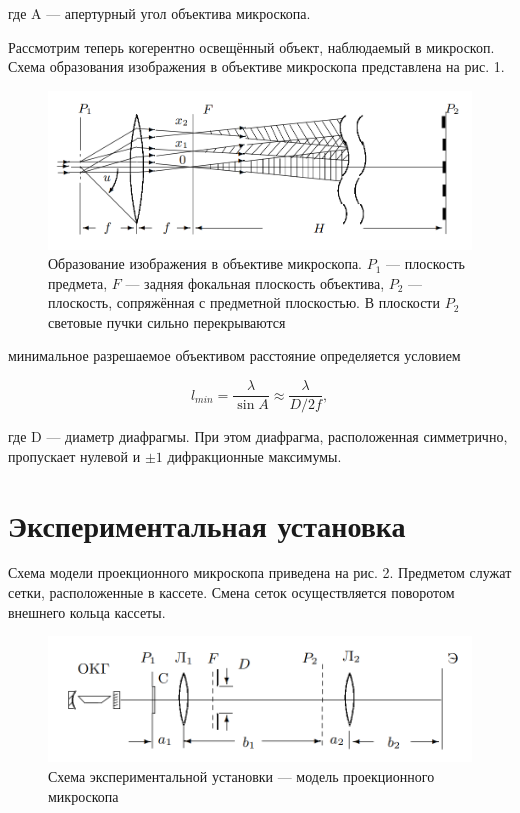 \documentclass[12pt]{article}
\begin{document}
где A — апертурный угол объектива микроскопа. \par
Рассмотрим теперь когерентно освещённый объект, наблюдаемый в микроскоп. Схема образования изображения в объективе микроскопа
представлена на рис. 1.
    \begin{figure}[h]
    \centering
    \includegraphics[width=15cm]{fig2.PNG}
    \caption{Образование изображения в объективе микроскопа. $P_1$ — плоскость предмета, $F$ — задняя фокальная плоскость объектива, $P_2$ — плоскость,
сопряжённая с предметной плоскостью. В плоскости $P_2$ световые пучки
сильно перекрываются}
    \label{fig:vac}
\end{figure}

минимальное разрешаемое объективом расстояние
определяется условием

\begin{equation}
    l_{min} = \frac{\lambda}{\sin A} \approx \frac{\lambda}{D/2f},
\end{equation}

где D — диаметр диафрагмы. При этом диафрагма, расположенная
симметрично, пропускает нулевой и $\pm1$ дифракционные максимумы.


\section{Экспериментальная установка}

Схема модели проекционного микроскопа приведена на рис. 2. Предметом служат сетки, расположенные
в кассете. Смена сеток осуществляется поворотом внешнего кольца кассеты.

    \begin{figure}[h]
    \centering
    \includegraphics[width=15cm]{fig1.PNG}
    \caption{Схема экспериментальной установки — модель проекционного
микроскопа}
    \label{fig:vac}
\end{figure}
\end{document}
